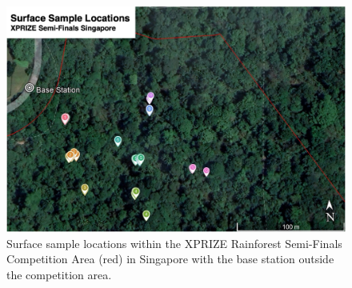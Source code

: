 \documentclass[journal=esthag,manuscript=article, layout=traditional, email=true]{achemso} %
\begin{document}
\begin{figure}[tbh]
    \centering
    \includegraphics[width=\linewidth]{figures/s2_xprize_map.png}
    \caption{Surface sample locations within the XPRIZE Rainforest Semi-Finals Competition Area (red) in Singapore with the base station outside the competition area.}
    \label{fig:s1-sample-location}
\end{figure}
\end{document}

